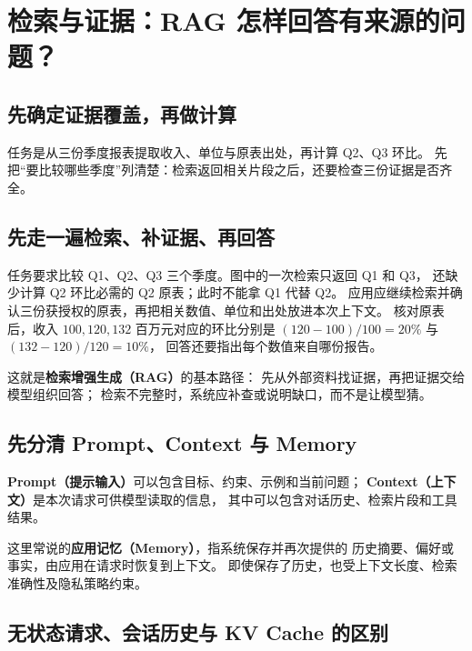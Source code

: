 \chapterrule
\section{检索与证据：RAG 怎样回答有来源的问题？}
\label{intro:rag}

\subsection{先确定证据覆盖，再做计算}
任务是从三份季度报表提取收入、单位与原表出处，再计算 Q2、Q3 环比。
先把“要比较哪些季度”列清楚：检索返回相关片段之后，还要检查三份证据是否齐全。



\subsection{先走一遍检索、补证据、再回答}
\label{concept:rag}

任务要求比较 Q1、Q2、Q3 三个季度。图中的一次检索只返回 Q1 和 Q3，
还缺少计算 Q2 环比必需的 Q2 原表；此时不能拿 Q1 代替 Q2。
应用应继续检索并确认三份获授权的原表，再把相关数值、单位和出处放进本次上下文。
核对原表后，收入 $100,120,132$ 百万元对应的环比分别是
$(120-100)/100=20\%$ 与 $(132-120)/120=10\%$，
回答还要指出每个数值来自哪份报告。

这就是\textbf{检索增强生成（RAG）}的基本路径：
先从外部资料找证据，再把证据交给模型组织回答；
检索不完整时，系统应补查或说明缺口，而不是让模型猜。

\subsection{先分清 Prompt、Context 与 Memory}

\label{concept:prompt}\textbf{Prompt（提示输入）}可以包含目标、约束、示例和当前问题；
\label{concept:context}\textbf{Context（上下文）}是本次请求可供模型读取的信息，
其中可以包含对话历史、检索片段和工具结果。

这里常说的\label{concept:app-memory}\textbf{应用记忆（Memory）}，指系统保存并再次提供的
历史摘要、偏好或事实，由应用在请求时恢复到上下文。
即使保存了历史，也受上下文长度、检索准确性及隐私策略约束。


\subsection{无状态请求、会话历史与 KV Cache 的区别}

